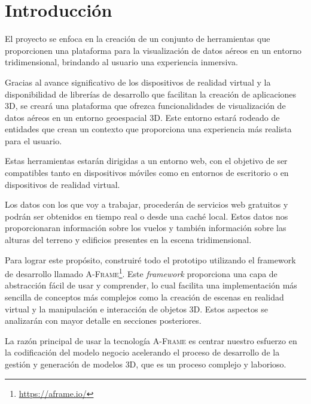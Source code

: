\documentclass[a4paper, 11pt]{book}
\begin{document}

\cleardoublepage
\chapter{Introducción}
\label{sec:intro} %
El proyecto se enfoca en la creación de un conjunto de herramientas que proporcionen una plataforma para la visualización de datos aéreos en un entorno tridimensional, brindando al usuario una experiencia inmersiva.

Gracias al avance significativo de los dispositivos de realidad virtual y la disponibilidad de librerías de desarrollo que facilitan la creación de aplicaciones \gls{3D}, se creará una plataforma que ofrezca funcionalidades de visualización de datos aéreos en un entorno geoespacial \textsc{3D}. Este entorno estará rodeado de entidades que crean un contexto que proporciona una experiencia más realista para el usuario.

Estas herramientas estarán dirigidas a un entorno web, con el objetivo de ser compatibles tanto en dispositivos móviles como en entornos de escritorio o en dispositivos de realidad virtual.

Los datos con los que voy a trabajar, procederán de servicios web gratuitos y podrán ser obtenidos en tiempo real o desde una caché local. Estos datos nos proporcionaran información sobre los vuelos y también información sobre las alturas del terreno y edificios presentes en la escena tridimensional.

Para lograr este propósito, construiré todo el prototipo utilizando el \Gls{framework} de desarrollo llamado \textsc{A-Frame}\footnote{\url{https://aframe.io/}}. Este \emph{framework} proporciona una capa de abstracción fácil de usar y comprender, lo cual facilita una implementación más sencilla de conceptos más complejos como la creación de escenas en realidad virtual y la manipulación e interacción de objetos \textsc{3D}. 
Estos aspectos se analizarán con mayor detalle en secciones posteriores.

La razón principal de usar la tecnología \textsc{A-Frame} es centrar nuestro esfuerzo en la codificación del modelo negocio acelerando el proceso de desarrollo de la gestión y generación de modelos \textsc{3D}, que es un proceso complejo y laborioso.
\end{document}
